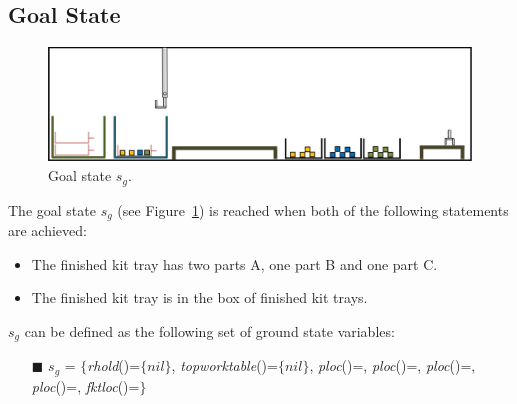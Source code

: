 \subsection{Goal State}

\begin{figure}[h!]
\centering
\includegraphics[width=12cm]{Figure/s_goal.jpg}
\caption{Goal state $s_g$.}
\label{fig:goal_state}
\end{figure}

The goal state $s_g$ (see Figure~\ref{fig:goal_state}) is reached when both of the following statements are achieved:

\begin{itemize}
\item The finished kit tray has two parts A, one part B and one part C.
\item The finished kit tray is in the box of finished kit trays.
\end{itemize}

$s_g$ can be defined as the following set of ground state variables:
\begin{itemize}
 \item[{\color{RubineRed}$\blacksquare$}] $s_g$ = $\lbrace$\textit{rhold}()=$\lbrace nil\rbrace$, \textit{topworktable}(\wtable)=$\lbrace nil\rbrace$, \textit{ploc}()=, \textit{ploc}()=, \textit{ploc}()=, \textit{ploc}()=, \textit{fktloc}()=$\rbrace$
\end{itemize}





